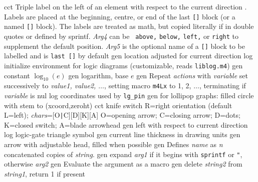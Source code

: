   {cct}
  {Triple label on the left of an element with respect to the current
    direction .  Labels are placed at the beginning,
    centre, or end of the last {\tt []} block (or a named {\tt []}
    block). The labels are treated as math, but copied literally if
    in double quotes or defined by sprintf.  {\sl Arg4} can be {\tt
    above,} {\tt below,} {\tt left,} or {\tt right} to supplement the
    default position.  {\sl Arg5} is the optional name of a {\tt []}
    block to be labelled and is {\tt last []} by default}
  {gen}
  {location adjusted for current direction}
  {log}
  {initialize environment for logic diagrams
    (customizable, reads {\tt liblog.m4})}
  {gen}
  {constant $\log_{10}(e)$}
  {gen}
  {logarithm, base $e$}
  {gen}
  {Repeat {\sl actions} with {\sl variable} set successively to
   {\sl value1, value2, $\ldots$}, setting macro {\tt m4Lx} to 1, 2,
   $\ldots$, terminating if {\sl variable} is nul}
  {log}
  {coordinates used by {\tt lg\_pin}}
 {gen}
  {for lollipop graphs: filled circle with stem to
  (xcoord,zeroht)}
  {cct}
  {knife switch R=right orientation (default L=left);
    {\sl chars}=[O{\tt|}C][D][K][A] O=opening arrow; C=closing arrow;
    D=dots; K=closed switch; A=blade arrowhead }
  {gen}
  {left with respect to current direction}
  {log}
  {logic-gate triangle symbol}
  {gen}
  {current line thickness in drawing units}
%
  {gen}
  {arrow with adjustable head, filled when possible}
  {gen}
  {Defines {\sl name} as {\sl n} concatenated copies of {\sl
  string}.}
  {gen}
  {expand {\sl arg1} if it begins
    with {\tt sprintf} or {\tt "}, otherwise {\sl arg2}}
  {gen}
  {Evaluate the argument as a macro}
  {gen}
  {delete {\sl string2} from {\sl string1}, return 1 if present}
